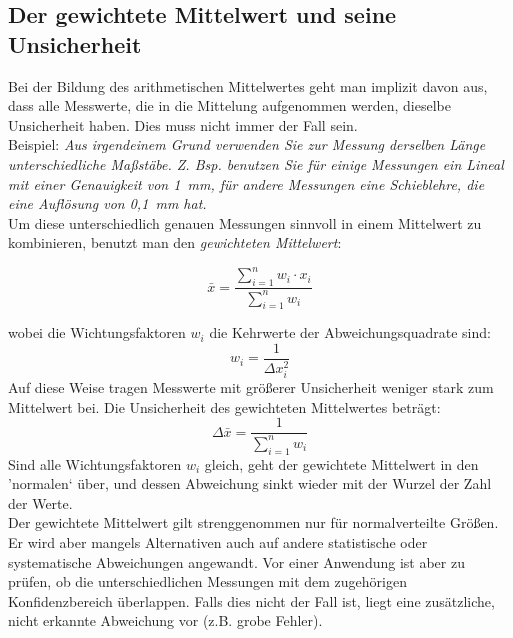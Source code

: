 \subsection{Der gewichtete Mittelwert und seine Unsicherheit}

Bei der Bildung des arithmetischen Mittelwertes geht man implizit davon aus, dass alle Messwerte, die in die Mittelung aufgenommen werden, dieselbe Unsicherheit haben. Dies muss nicht immer der Fall sein.\\

Beispiel: \textit{Aus irgendeinem Grund verwenden Sie zur Messung derselben Länge unterschiedliche Maßstäbe. Z. Bsp. benutzen Sie für einige Messungen ein Lineal mit einer Genauigkeit von 1~mm, für andere Messungen eine Schieblehre, die eine Auflösung von 0,1~mm hat.}\\

Um diese unterschiedlich genauen Messungen sinnvoll in einem Mittelwert zu kombinieren, benutzt man den \textit{gewichteten Mittelwert}:
\begin{important}
	\begin{equation}
		\bar{x} = \frac{\sum_{i=1}^n{w_i\cdot x_i}}{\sum_{i=1}^n{w_i}}
	\end{equation}
\end{important}
wobei die Wichtungsfaktoren $w_i$ die Kehrwerte der Abweichungsquadrate sind:
\begin{equation*}
	w_i = \frac{1}{\Delta x_i^2}
\end{equation*}
Auf diese Weise tragen Messwerte mit größerer Unsicherheit weniger stark zum Mittelwert bei. Die Unsicherheit des gewichteten Mittelwertes beträgt:
\begin{equation}
	\Delta\bar{x} = \frac{1}{\sum_{i=1}^n{w_i}}
\end{equation}
Sind alle Wichtungsfaktoren $w_i$ gleich, geht der gewichtete Mittelwert in den 'normalen` über, und dessen Abweichung sinkt wieder mit der Wurzel der Zahl der Werte.\\

Der gewichtete Mittelwert gilt strenggenommen nur für normalverteilte Größen. Er wird aber mangels Alternativen auch auf andere statistische oder systematische Abweichungen angewandt. Vor einer Anwendung ist aber zu prüfen, ob die unterschiedlichen Messungen mit dem zugehörigen Konfidenzbereich überlappen. Falls dies nicht der Fall ist, liegt eine zusätzliche, nicht erkannte Abweichung vor (z.B. grobe Fehler).\\


